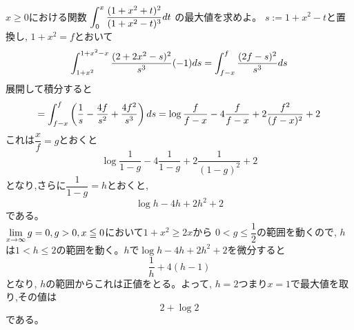 $x\geq 0$における関数 $\displaystyle\int_{0}^x \dfrac{(1+x^2+t)^2}{(1+x^2-t)^3} dt$ の最大値を求めよ。
\enthm
$s:=1+x^2-t$と置換し, $1+x^2=f$とおいて
\[\displaystyle\int_{1+x^2}^{1+x^2-x} \dfrac{(2+2x^2-s)^2}{s^3} (-1)ds=\displaystyle\int_{f-x}^{f} \dfrac{(2f-s)^2}{s^3}ds\]
展開して積分すると
\[=\displaystyle\int_{f-x}^{f}\left(\dfrac{1}{s} -\dfrac{4f}{s^2}+\dfrac{4f^2}{s^3}\right)ds=\log{\dfrac{f}{f-x}}-4\dfrac{f}{f-x} +2\dfrac{f^2}{(f-x)^2}+2\]
これは$\dfrac{x}{f}=g$とおくと
\[\log{\dfrac{1}{1-g}}-4\dfrac{1}{1-g}+2\dfrac{1}{(1-g)^2}+2\]
となり,さらに$\dfrac{1}{1-g}=h$とおくと,
\[\log{h}-4h+2h^2+2\]
である。\\
$\displaystyle\lim_{x\to\infty}g=0, g>0, x\leqq 0$において$1+x^2\geq 2x$から $0<g\leq\dfrac{1}{2}$の範囲を動くので, $h$は$1<h\leq 2$の範囲を動く。$h$で$\log{h}-4h+2h^2+2$を微分すると
\[\dfrac{1}{h}+4(h-1)\]
となり, $h$の範囲からこれは正値をとる。よって, $h=2$つまり$x=1$で最大値を取り,その値は
\[2+\log{2}\]
である。
